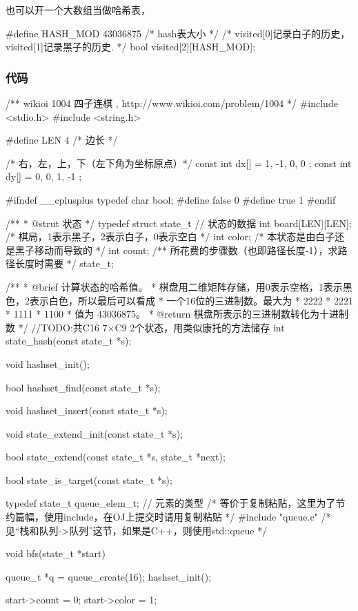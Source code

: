 也可以开一个大数组当做哈希表，
\begin{Code}
#define HASH_MOD 43036875 /* hash表大小 */
/* visited[0]记录白子的历史， visited[1]记录黑子的历史. */
bool visited[2][HASH_MOD];
\end{Code}

\subsubsection{代码}
\begin{Codex}[label=four_adjacent.c]
/** wikioi 1004 四子连棋  , http://www.wikioi.com/problem/1004 */
#include <stdio.h>
#include <string.h>

#define LEN 4   /* 边长 */

/* 右，左，上，下（左下角为坐标原点）*/
const int dx[] = { 1, -1, 0, 0 };
const int dy[] = { 0, 0, 1, -1 };


#ifndef __cplusplus
typedef char bool;
#define false 0
#define true 1
#endif

/**
 * @strut 状态
 */
typedef struct state_t {
    // 状态的数据
    int board[LEN][LEN]; /* 棋局，1表示黑子，2表示白子，0表示空白 */
    int color; /* 本状态是由白子还是黑子移动而导致的 */
    int count;  /** 所花费的步骤数（也即路径长度-1），求路径长度时需要 */
} state_t;

/**
 * @brief 计算状态的哈希值。
 * 棋盘用二维矩阵存储，用0表示空格，1表示黑色，2表示白色，所以最后可以看成
 * 一个16位的三进制数。最大为
 * 2222
 * 2221
 * 1111
 * 1100
 * 值为 43036875。
 * @return 棋盘所表示的三进制数转化为十进制数
 */
//TODO:共C16 7×C9 2个状态，用类似康托的方法储存
int state_hash(const state_t *s);

void hashset_init();

bool hashset_find(const state_t *s);

void hashset_insert(const state_t *s);

void state_extend_init(const state_t *s);

bool state_extend(const state_t *s, state_t *next);

bool state_is_target(const state_t *s);

typedef state_t queue_elem_t; // 元素的类型
/* 等价于复制粘贴，这里为了节约篇幅，使用include，在OJ上提交时请用复制粘贴 */
#include "queue.c"  /* 见“栈和队列->队列”这节，如果是C++，则使用std::queue */

void bfs(state_t *start) {
    queue_t *q = queue_create(16);
    hashset_init();

    start->count = 0;
    start->color = 1;

}
\end{Codex}
